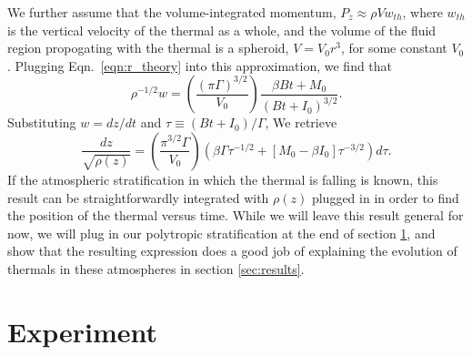 \documentclass[twocolumn, amsmath, amsfonts, amssymb, trackchanges]{aastex62}
\begin{document}
We further assume that the volume-integrated momentum, $P_z \approx \rho V w_{th}$,
where $w_{th}$ is the vertical velocity of the thermal as a whole, and the volume
of the fluid region propogating with the thermal is a spheroid, $V = V_0 r^3$, for
some constant $V_0$. Plugging Eqn.~\ref{eqn:r_theory} into this approximation, we
find that
\begin{equation}
\rho^{-1/2}w = \left(\frac{(\pi\Gamma)^{3/2}}{V_0}\right)\frac{\beta B t + M_0}{(B t + I_0)^{3/2}}.
\end{equation}
Substituting $w = dz/dt$ and $\tau \equiv (Bt + I_0)/\Gamma$, We retrieve
\begin{equation}
\frac{dz}{\sqrt{\rho(z)}} 
= \left(\frac{\pi^{3/2}\Gamma}{V_0}\right)
\left(\beta\Gamma\tau^{-1/2} + [M_0 - \beta I_0]\tau^{-3/2}\right)d\tau.
\label{eqn:general_theory}
\end{equation}
If the atmospheric stratification in which the thermal is falling is known, this
result can be straightforwardly integrated with $\rho(z)$ plugged in in order to
find the position of the thermal versus time. While we will leave this result
general for now, we will plug in our polytropic stratification at the end of
section \ref{sec:experiment}, and show that the resulting expression does a
good job of explaining the evolution of thermals in these atmospheres in
section \ref{sec:results}.

\section{Experiment} 
\label{sec:experiment}
\end{document}
